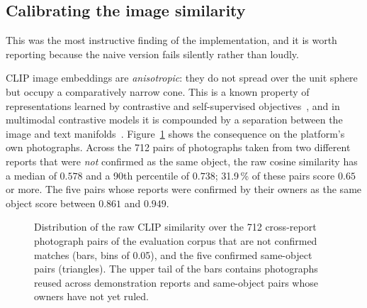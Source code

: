 \subsection{Calibrating the image similarity}
\label{sec:calibration}

This was the most instructive finding of the implementation, and it is worth
reporting because the naive version fails silently rather than loudly.

CLIP image embeddings are \emph{anisotropic}: they do not spread over the unit
sphere but occupy a comparatively narrow cone. This is a known property of
representations learned by contrastive and self-supervised
objectives~\cite{ethayarajh2019anisotropy}, and in multimodal contrastive models
it is compounded by a separation between the image and text
manifolds~\cite{liang2022modalitygap}. Figure~\ref{fig:clip-hist} shows the
consequence on the platform's own photographs. Across the 712 pairs of
photographs taken from two different reports that were \emph{not} confirmed as
the same object, the raw cosine similarity has a median of $0.578$ and a 90th
percentile of $0.738$; 31.9\,\% of these pairs score $0.65$ or more. The five
pairs whose reports were confirmed by their owners as the same object score
between $0.861$ and $0.949$.

\begin{figure}[htbp]
\centering
{}
\caption{Distribution of the raw CLIP similarity over the 712 cross-report
photograph pairs of the evaluation corpus that are not confirmed matches (bars,
bins of 0.05), and the five confirmed same-object pairs (triangles). The upper
tail of the bars contains photographs reused across demonstration reports and
same-object pairs whose owners have not yet ruled.}
\label{fig:clip-hist}
\end{figure}

